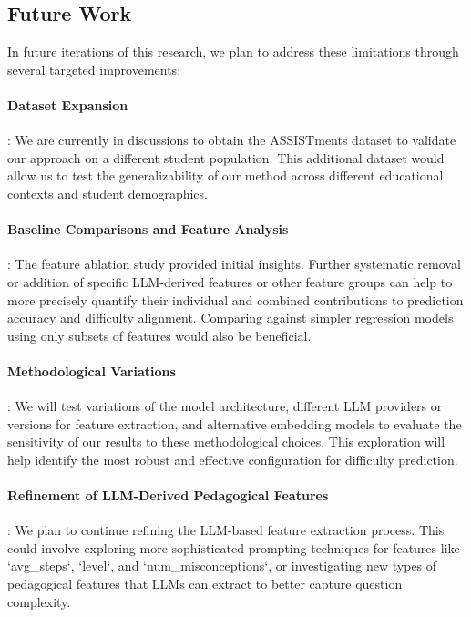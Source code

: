 \documentclass[
    a4paper, %
    10pt, %
    twoside, %
]{LTJournalArticle}
\begin{document}
\subsection{Future Work}

In future iterations of this research, we plan to address these limitations through several targeted improvements:

\paragraph{Dataset Expansion}: We are currently in discussions to obtain the ASSISTments dataset to validate our approach on a different student population. This additional dataset would allow us to test the generalizability of our method across different educational contexts and student demographics.
    
\paragraph{Baseline Comparisons and Feature Analysis}: The feature ablation study provided initial insights. Further systematic removal or addition of specific LLM-derived features or other feature groups can help to more precisely quantify their individual and combined contributions to prediction accuracy and difficulty alignment. Comparing against simpler regression models using only subsets of features would also be beneficial.
    
\paragraph{Methodological Variations}: We will test variations of the model architecture, different LLM providers or versions for feature extraction, and alternative embedding models to evaluate the sensitivity of our results to these methodological choices. This exploration will help identify the most robust and effective configuration for difficulty prediction.
    
\paragraph{Refinement of LLM-Derived Pedagogical Features}: We plan to continue refining the LLM-based feature extraction process. This could involve exploring more sophisticated prompting techniques for features like `avg\_steps`, `level`, and `num\_misconceptions`, or investigating new types of pedagogical features that LLMs can extract to better capture question complexity.
    
\end{document}
